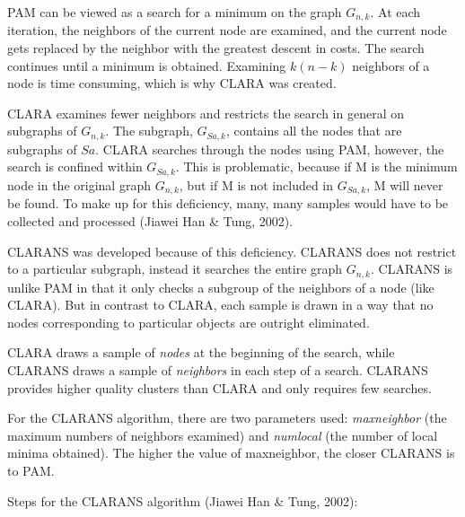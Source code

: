 \documentclass[12pt,twoside]{amherstthesis}
\begin{document}
  PAM can be viewed as a search for a minimum on the graph \(G_{n,k}\). At
  each iteration, the neighbors of the current node are examined, and the
  current node gets replaced by the neighbor with the greatest descent in
  costs. The search continues until a minimum is obtained. Examining
  \(k(n-k)\) neighbors of a node is time consuming, which is why CLARA was
  created.
  
  CLARA examines fewer neighbors and restricts the search in general on
  subgraphs of \(G_{n,k}\). The subgraph, \(G_{Sa,k}\), contains all the
  nodes that are subgraphs of \(Sa\). CLARA searches through the nodes
  using PAM, however, the search is confined within \(G_{Sa,k}\). This is
  problematic, because if M is the minimum node in the original graph
  \(G_{n,k}\), but if M is not included in \(G_{Sa,k}\), M will never be
  found. To make up for this deficiency, many, many samples would have to
  be collected and processed (Jiawei Han \& Tung, 2002).
  
  CLARANS was developed because of this deficiency. CLARANS does not
  restrict to a particular subgraph, instead it searches the entire graph
  \(G_{n,k}\). CLARANS is unlike PAM in that it only checks a subgroup of
  the neighbors of a node (like CLARA). But in contrast to CLARA, each
  sample is drawn in a way that no nodes corresponding to particular
  objects are outright eliminated.
  
  CLARA draws a sample of \emph{nodes} at the beginning of the search,
  while CLARANS draws a sample of \emph{neighbors} in each step of a
  search. CLARANS provides higher quality clusters than CLARA and only
  requires few searches.
  
  For the CLARANS algorithm, there are two parameters used:
  \emph{maxneighbor} (the maximum numbers of neighbors examined) and
  \emph{numlocal} (the number of local minima obtained). The higher the
  value of maxneighbor, the closer CLARANS is to PAM.
  
  Steps for the CLARANS algorithm (Jiawei Han \& Tung, 2002):
  
\end{document}
